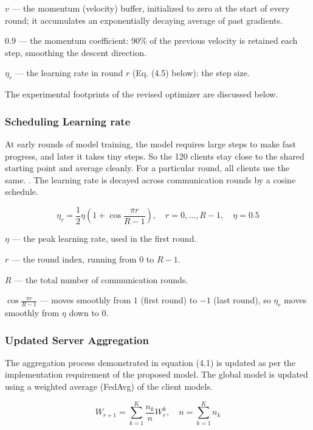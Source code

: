 $v$ --- the momentum (velocity) buffer, initialized to zero at the start of every round; it accumulates an exponentially decaying average of past gradients.

$0.9$ --- the momentum coefficient: 90\% of the previous velocity is retained each step, smoothing the descent direction.

$\eta_{r}$ --- the learning rate in round $r$ (Eq. (4.5) below): the step size.

The experimental footprints of the revised optimizer are discussed below.

\subsubsection{Scheduling Learning rate}
At early rounds of model training, the model requires large steps to make fast progress, and later it takes tiny steps. So the 120 clients stay close to the shared starting point and average cleanly. For a particular round, all clients use the same.  .  The learning rate is decayed across communication rounds by a cosine schedule.

\begin{equation}
  \eta_{r} = \frac{1}{2} \eta \left(1 + \cos \frac{\pi r}{R-1}\right), \quad r = 0, \ldots, R-1, \quad \eta = 0.5
  \label{eq:ch4_4_5}
\end{equation}

$\eta$ --- the peak learning rate, used in the first round.

$r$ --- the round index, running from $0$ to $R-1$.

$R$ --- the total number of communication rounds.

$\cos\frac{\pi r}{R-1}$ --- moves smoothly from $1$ (first round) to $-1$ (last round), so $\eta_{r}$ moves smoothly from $\eta$ down to $0$.

\subsubsection{Updated Server Aggregation}
The aggregation process demonstrated in equation (4.1) is updated as per the implementation requirement of the proposed model. The global model is updated using a weighted average (FedAvg) of the client models.

\begin{equation}
  W_{r+1} = \sum_{k=1}^{K} \frac{n_{k}}{n} W_{r}^{k}, \quad n = \sum_{k=1}^{K} n_{k}
  \label{eq:ch4_4_6}
\end{equation}

